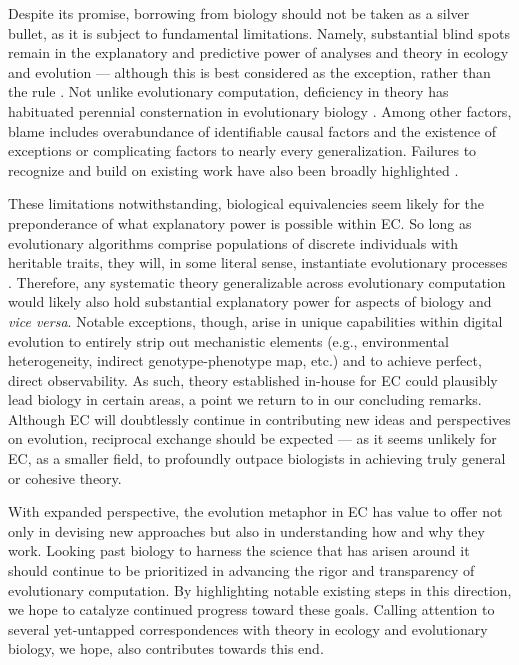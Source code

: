 


Despite its promise, borrowing from biology should not be taken as a silver bullet, as it is subject to fundamental limitations.
Namely, substantial blind spots remain in the explanatory and predictive power of analyses and theory in ecology and evolution \citep{houlahan2016priority,catford2022addressing,yates2018outstanding} --- although this is best considered as the exception, rather than the rule \citep{lynch2025complexity}.
Not unlike evolutionary computation, deficiency in theory has habituated perennial consternation in evolutionary biology \citep{welch2017wrong}.
Among other factors, blame includes overabundance of identifiable causal factors and the existence of exceptions or complicating factors to nearly every generalization.
Failures to recognize and build on existing work have also been broadly highlighted \citep{lynch2025complexity,beer2024alife}.

These limitations notwithstanding, biological equivalencies seem likely for the preponderance of what explanatory power is possible within EC.
So long as evolutionary algorithms comprise populations of discrete individuals with heritable traits, they will, in some literal sense, instantiate evolutionary processes \citep{pennock2007models}.
Therefore, any systematic theory generalizable across evolutionary computation would likely also hold substantial explanatory power for aspects of biology and \textit{vice versa}.
Notable exceptions, though, arise in unique capabilities within digital evolution to entirely strip out mechanistic elements (e.g., environmental heterogeneity, indirect genotype-phenotype map, etc.) and to achieve perfect, direct observability.
As such, theory established in-house for EC could plausibly lead biology in certain areas, a point we return to in our concluding remarks.
Although EC will doubtlessly continue in contributing new ideas and perspectives on evolution, reciprocal exchange should be expected --- as it seems unlikely for EC, as a smaller field, to profoundly outpace biologists in achieving truly general or cohesive theory.

With expanded perspective, the evolution metaphor in EC has value to offer not only in devising new approaches but also in understanding how and why they work.
Looking past biology to harness the science that has arisen around it should continue to be prioritized in advancing the rigor and transparency of evolutionary computation.
By highlighting notable existing steps in this direction, we hope to catalyze continued progress toward these goals.
Calling attention to several yet-untapped correspondences with theory in ecology and evolutionary biology, we hope, also contributes towards this end.
